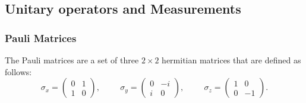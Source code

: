 \subsection{Unitary operators and Measurements}\label{subsec:unitary-operators&measurements}




\subsubsection{Pauli Matrices}
The Pauli matrices are a set of three $2 \times 2$ hermitian matrices that are defined as follows:
\begin{equation*}
  \sigma_{x} = \begin{pmatrix} 0 & 1\\ 1 & 0 \end{pmatrix}, \hspace{1cm} \sigma_{y} = \begin{pmatrix} 0 & -i\\ i & 0 \end{pmatrix}, \hspace{1cm} \sigma_{z} = \begin{pmatrix} 1 & 0\\ 0 & -1 \end{pmatrix}.
\end{equation*}


